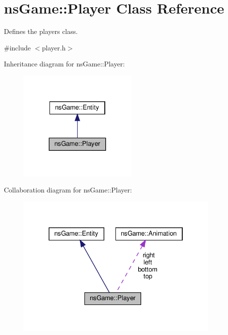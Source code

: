 \hypertarget{classns_game_1_1_player}{}\section{ns\+Game\+:\+:Player Class Reference}
\label{classns_game_1_1_player}


Defines the player\textquotesingle{}s class.  




{\ttfamily \#include $<$player.\+h$>$}



Inheritance diagram for ns\+Game\+:\+:Player\+:\nopagebreak
\begin{figure}[H]
\begin{center}
\leavevmode
\includegraphics[width=167pt]{classns_game_1_1_player__inherit__graph}
\end{center}
\end{figure}


Collaboration diagram for ns\+Game\+:\+:Player\+:\nopagebreak
\begin{figure}[H]
\begin{center}
\leavevmode
\includegraphics[width=286pt]{classns_game_1_1_player__coll__graph}
\end{center}
\end{figure}
